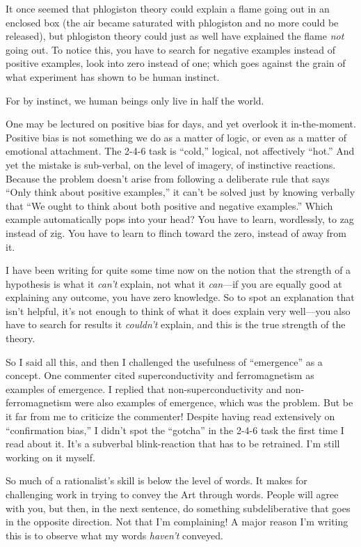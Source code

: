 {
 It once seemed that phlogiston theory could explain a flame going
out in an enclosed box (the air became saturated with phlogiston and no
more could be released), but phlogiston theory could just as well have
explained the flame \textit{not} going out. To notice this, you have to
search for negative examples instead of positive examples, look into
zero instead of one; which goes against the grain of what experiment
has shown to be human instinct.}

{
 For by instinct, we human beings only live in half the world.}

{
 One may be lectured on positive bias for days, and yet overlook it
in-the-moment. Positive bias is not something we do as a matter of
logic, or even as a matter of emotional attachment. The 2-4-6 task is
``cold,'' logical, not affectively
``hot.'' And yet the mistake is
sub-verbal, on the level of imagery, of instinctive reactions. Because
the problem doesn't arise from following a deliberate
rule that says ``Only think about positive
examples,'' it can't be solved just
by knowing verbally that ``We ought to think about
both positive and negative examples.'' Which example
automatically pops into your head? You have to learn, wordlessly, to
zag instead of zig. You have to learn to flinch toward the zero,
instead of away from it.}

{
 I have been writing for quite some time now on the notion that the
strength of a hypothesis is what it \textit{can't}
explain, not what it \textit{can}{}---if you are equally good at
explaining any outcome, you have zero knowledge. So to spot an
explanation that isn't helpful, it's
not enough to think of what it does explain very well---you also have
to search for results it \textit{couldn't} explain, and
this is the true strength of the theory.}

{
 So I said all this, and then I challenged the usefulness of
``emergence'' as a concept. One
commenter cited superconductivity and ferromagnetism as examples of
emergence. I replied that non-superconductivity and non-ferromagnetism
were also examples of emergence, which was the problem. But be it far
from me to criticize the commenter! Despite having read extensively on
``confirmation bias,'' I
didn't spot the
``gotcha'' in the 2-4-6 task the
first time I read about it. It's a subverbal
blink-reaction that has to be retrained. I'm still
working on it myself.}

{
 So much of a rationalist's skill is below the
level of words. It makes for challenging work in trying to convey the
Art through words. People will agree with you, but then, in the next
sentence, do something subdeliberative that goes in the opposite
direction. Not that I'm complaining! A major reason
I'm writing this is to observe what my words
\textit{haven't} conveyed.}

